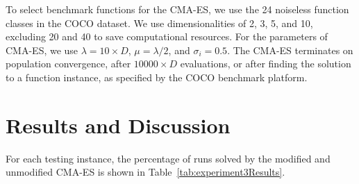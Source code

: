 \documentclass[sigconf]{acmart}
\begin{document}
To select benchmark functions for the CMA-ES, we use the 24 noiseless function classes in the COCO dataset. We use dimensionalities of 2, 3, 5, and 10, excluding 20 and 40 to save computational resources. For the parameters of CMA-ES, we use $\lambda=10 \times D$, $\mu = \lambda/2$, and $\sigma_i = 0.5$. The CMA-ES terminates on population convergence, after $10000 \times D$ evaluations, or after finding the solution to a function instance, as specified by the COCO benchmark platform.

\section{Results and Discussion}
\label{Results}

For each testing instance, the percentage of runs solved by the modified and unmodified CMA-ES is shown in Table~\ref{tab:experiment3Results}.
\end{document}
